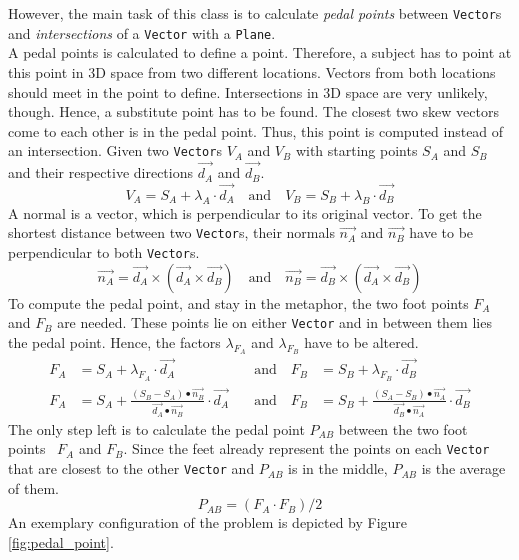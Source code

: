 However, the main task of this class is to calculate \textit{pedal points} between \texttt{Vector}s and \textit{intersections} of a \texttt{Vector} with a \texttt{Plane}. 
\\
A pedal points is calculated to define a point. Therefore, a subject has to point at this point in \ac{3D} space from two different locations. Vectors  from both locations should meet in the point to define. Intersections in \ac{3D} space are very unlikely, though. Hence, a substitute point has to be found. The closest two skew vectors come to each other is in the pedal point. Thus, this point is computed instead of an intersection. Given two \texttt{Vector}s $V_{A}$ and $V_{B}$ with starting points $S_{A}$ and $S_{B}$ and their respective directions $\overrightarrow{d_{A}}$ and $\overrightarrow{d_{B}}$.
$$V_{A} = S_{A} + \lambda_{A} \cdot \overrightarrow{d_{A}} \quad \text{and} \quad V_{B} = S_{B} + \lambda_{B} \cdot \overrightarrow{d_{B}}$$
A normal is a vector, which is perpendicular to its original vector. To get the shortest distance between two \texttt{Vector}s, their normals $\overrightarrow{n_{A}}$ and $\overrightarrow{n_{B}}$ have to be perpendicular to both \texttt{Vector}s. 
$$\overrightarrow{n_{A}} = \overrightarrow{d_{A}} \times (\overrightarrow{d_{A}} \times \overrightarrow{d_{B}}) \quad \text{and} \quad \overrightarrow{n_{B}} = \overrightarrow{d_{B}} \times (\overrightarrow{d_{A}} \times \overrightarrow{d_{B}})$$
To compute the pedal point, and stay in the metaphor, the two foot points $F_{A}$ and $F_{B}$ are needed. These points lie on either \texttt{Vector} and in between them lies the pedal point. Hence, the factors $\lambda_{F_{A}}$ and $\lambda_{F_{B}}$ have to be altered.
\begin{align*}
	F_{A} &= S_{A} + \lambda_{F_{A}} \cdot \overrightarrow{d_{A}} \quad &\text{and} \quad F_{B} &= S_{B} + \lambda_{F_{B}} \cdot \overrightarrow{d_{B}} \\
	F_{A} &= S_{A} + \frac{(S_{B} - S_{A}) \bullet \overrightarrow{n_{B}}}{\overrightarrow{d_{A}} \bullet \overrightarrow{n_{B}}} \cdot \overrightarrow{d_{A}} \quad &\text{and} \quad F_{B} &= S_{B} + \frac{(S_{A} - S_{B}) \bullet \overrightarrow{n_{A}}}{\overrightarrow{d_{B}} \bullet \overrightarrow{n_{A}}} \cdot \overrightarrow{d_{B}} 
\end{align*}
The only step left is to calculate the pedal point $P_{AB}$ between the two foot points~\cite{PedalPoint} $F_{A}$ and $F_{B}$. Since the feet already represent the points on each \texttt{Vector} that are closest to the other \texttt{Vector} and $P_{AB}$ is in the middle, $P_{AB}$ is the average of them.
$$P_{AB} = (F_{A} \cdot F_{B}) / 2$$
An exemplary configuration of the problem is depicted by Figure \ref{fig:pedal_point}.

